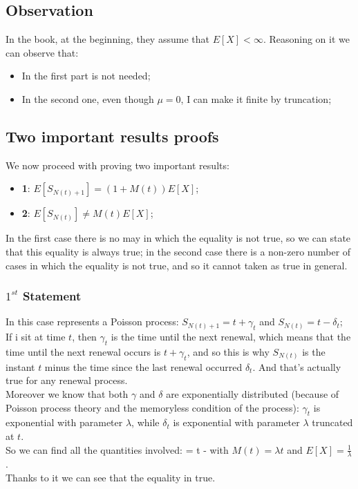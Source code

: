 	\subsection*{Observation}
	In the book, at the beginning, they assume that $E[X] < \infty$. Reasoning on it we can observe that:
	\begin{itemize}
	\item In the first part is not needed;
	\item In the second one, even though $\mu = 0$, I can make it finite by truncation;
	\end{itemize}
	\subsection{Two important results proofs}
	We now proceed with proving two important results:
	\begin{itemize}
	\item \textbf{1}: $E[S_{N(t)+1}] = (1+M(t))E[X]$;
	\item \textbf{2}: $E[S_{N(t)}] \ne M(t)E[X]$;
	\end{itemize}
	In the first case there is no may in which the equality is not true, so we can state that this equality is always true; in the second case there is a non-zero number of cases in which the equality is not true, and so it cannot taken as true in general.
	\subsubsection*{$1^{st}$ Statement}
	In this case represents a Poisson process: $S_{N(t)+1} = t + \gamma_t$ and $S_{N(t)} = t - \delta_t$;\\
	If i sit at time $t$, then $\gamma_t$ is the time until the next renewal, which means that the time until the next renewal occurs is $t + \gamma_t$, and so this is why $S_{N(t)}$ is the instant $t$ minus the time since the last renewal occurred $\delta_t$. And that's actually true for any renewal process.\\
	Moreover we know that both $\gamma$ and $\delta$ are exponentially distributed (because of Poisson process theory and the memoryless condition of the process): $\gamma_t$ is exponential with parameter $\lambda$, while $\delta_t$ is exponential with parameter $\lambda$ truncated at $t$.\\
	So we can find all the quantities involved:%
	\beq
	\exp\left[S_{N(t)+1} = t + \frac{1}{\lambda}\right] \qquad \exp\left[S_{N(t)}\right] = t - 
	\eeq
	with $M(t) = \lambda t$ and $E[X] = \frac{1}{\lambda}$.\\
	Thanks to it we can see that the equality in true.

